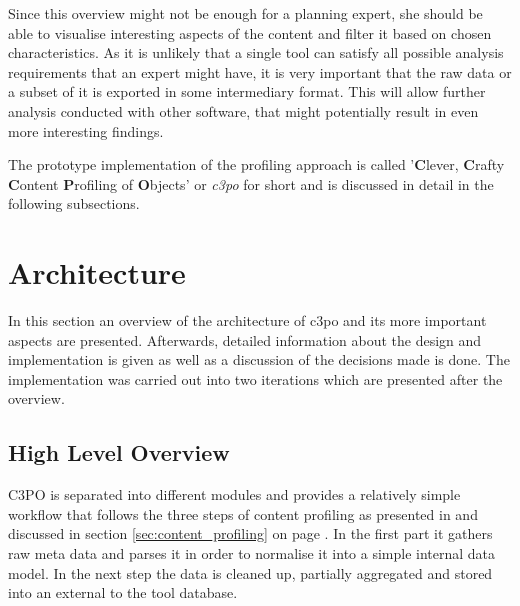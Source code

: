 Since this overview might not be enough for a planning expert, she should be able to visualise interesting aspects of the content and filter it based on chosen characteristics. As it is unlikely that a single tool can satisfy all possible analysis requirements that an expert might have, it is very important that the raw data or a subset of it is exported in some intermediary format. This will allow further analysis conducted with other software, that might potentially result in even more interesting findings. 


The prototype implementation of the profiling approach is called '\textbf{C}lever, \textbf{C}rafty \textbf{C}ontent \textbf{P}rofiling of \textbf{O}bjects' or \textit{c3po} for short and is discussed in detail in the following subsections.

\section{Architecture}
In this section an overview of the architecture of c3po and its more important aspects are presented. Afterwards, detailed information about the design and implementation is given as well as a discussion of the decisions made is done. The implementation was carried out into two iterations which are presented after the overview.

\subsection{High Level Overview}
C3PO is separated into different modules and provides a relatively simple workflow that follows the three steps of content profiling as presented in \cite{petrov-ipres2012} and discussed in section \ref{sec:content_profiling} on page \pageref{sec:content_profiling}. In the first part it gathers raw meta data and parses it in order to normalise it into a simple internal data model. In the next step the data is cleaned up, partially aggregated and stored into an external to the tool database. 

